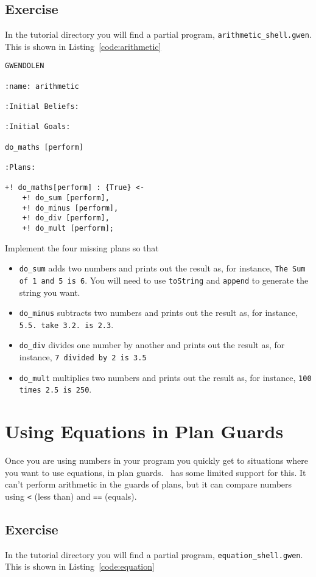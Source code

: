 \documentclass[a4]{article}
\begin{document}
\subsection{Exercise}
In the tutorial directory you will find a partial program, \texttt{arithmetic\_shell.gwen}.  This is shown in Listing~\ref{code:arithmetic}

\begin{lstlisting}[float,caption=Arithmetic Program,basicstyle=\sffamily,style=easslisting,language=Gwendolen,label=code:arithmetic]
GWENDOLEN

:name: arithmetic

:Initial Beliefs:

:Initial Goals:

do_maths [perform]

:Plans:
	
+! do_maths[perform] : {True} <-
	+! do_sum [perform],
	+! do_minus [perform],
	+! do_div [perform],
	+! do_mult [perform];
\end{lstlisting}

Implement the four missing plans so that
\begin{itemize}
\item \lstinline{do_sum} adds two numbers and prints out the result as, for instance, \texttt{The Sum of 1 and 5 is 6}.  You will need to use \texttt{toString} and \texttt{append} to generate the string you want.
\item \lstinline{do_minus} subtracts two numbers and prints out the result as, for instance, \texttt{5.5. take 3.2. is 2.3}.
\item \lstinline{do_div} divides one number by another and prints out the result as, for instance, \texttt{7 divided by 2 is 3.5}
\item \lstinline{do_mult} multiplies two numbers and prints out the result as, for instance, \texttt{100 times 2.5 is 250}.
\end{itemize}

\section{Using Equations in Plan Guards}
Once you are using numbers in your program you quickly get to situations where you want to use equations, in plan guards.  \gwendolen\ has some limited support for this.  It can't perform arithmetic in the guards of plans, but it can compare numbers using \texttt{<} (less than) and \texttt{==} (equals).

\subsection{Exercise}
In the tutorial directory you will find a partial program, \texttt{equation\_shell.gwen}.  This is shown in Listing~\ref{code:equation}
\end{document}
